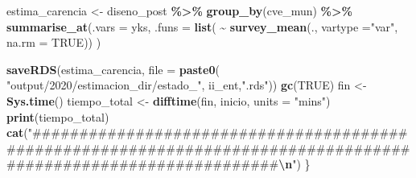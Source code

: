 \documentclass[
  12pt,
]{book}
\newenvironment{Shaded}{\begin{snugshade}}{\end{snugshade}}
\newcommand{\AttributeTok}[1]{\textcolor[rgb]{0.13,0.29,0.53}{#1}}
\newcommand{\ConstantTok}[1]{\textcolor[rgb]{0.56,0.35,0.01}{#1}}
\newcommand{\FunctionTok}[1]{\textcolor[rgb]{0.13,0.29,0.53}{\textbf{#1}}}
\newcommand{\NormalTok}[1]{#1}
\newcommand{\OtherTok}[1]{\textcolor[rgb]{0.56,0.35,0.01}{#1}}
\newcommand{\SpecialCharTok}[1]{\textcolor[rgb]{0.81,0.36,0.00}{\textbf{#1}}}
\newcommand{\StringTok}[1]{\textcolor[rgb]{0.31,0.60,0.02}{#1}}
\begin{document}
\begin{Shaded}
\begin{Highlighting}[]
\NormalTok{  estima\_carencia }\OtherTok{\textless{}{-}}\NormalTok{  diseno\_post }\SpecialCharTok{\%\textgreater{}\%} \FunctionTok{group\_by}\NormalTok{(cve\_mun) }\SpecialCharTok{\%\textgreater{}\%} 
    \FunctionTok{summarise\_at}\NormalTok{(}\AttributeTok{.vars =}\NormalTok{ yks, }\AttributeTok{.funs =} \FunctionTok{list}\NormalTok{(}
      \SpecialCharTok{\textasciitilde{}} \FunctionTok{survey\_mean}\NormalTok{(., }\AttributeTok{vartype =}\StringTok{"var"}\NormalTok{, }\AttributeTok{na.rm =} \ConstantTok{TRUE}\NormalTok{))}
\NormalTok{    )}
  
  \FunctionTok{saveRDS}\NormalTok{(estima\_carencia,}
          \AttributeTok{file =} \FunctionTok{paste0}\NormalTok{( }\StringTok{"output/2020/estimacion\_dir/estado\_"}\NormalTok{,}
\NormalTok{                         ii\_ent,}\StringTok{".rds"}\NormalTok{))}
  \FunctionTok{gc}\NormalTok{(}\ConstantTok{TRUE}\NormalTok{)}
\NormalTok{  fin }\OtherTok{\textless{}{-}} \FunctionTok{Sys.time}\NormalTok{()}
\NormalTok{  tiempo\_total }\OtherTok{\textless{}{-}} \FunctionTok{difftime}\NormalTok{(fin, inicio, }\AttributeTok{units =} \StringTok{"mins"}\NormalTok{)}
  \FunctionTok{print}\NormalTok{(tiempo\_total)}
  \FunctionTok{cat}\NormalTok{(}\StringTok{"\#\#\#\#\#\#\#\#\#\#\#\#\#\#\#\#\#\#\#\#\#\#\#\#\#\#\#\#\#\#\#\#\#\#\#\#\#\#\#\#\#\#\#\#\#\#\#\#\#\#\#\#\#\#\#\#\#\#\#\#\#\#\#\#\#\#\#\#\#\#\#\#\#\#\#\#\#\#\#\#\#\#\#\#\#\#\#\#\#\#\#\#\#\#\#\#\#\#\#\#\#\#\#\#\#\#\#\#\#\#\#\#}\SpecialCharTok{\textbackslash{}n}\StringTok{"}\NormalTok{)}
\NormalTok{\}}
\end{Highlighting}
\end{Shaded}
\end{document}
